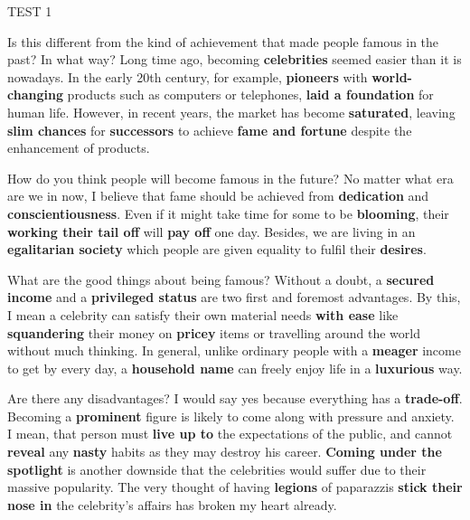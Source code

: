\begin{glossarymc}[Cambridge 5]
\begin{test}{TEST 1}
    \begin{qa}{Is this different from the kind of achievement that made people famous in the past? In what way?}
    Long time ago, becoming \textbf{celebrities} seemed easier than it is nowadays. In the early 20th century, for example, \textbf{pioneers} with \textbf{world-changing} products such as computers or telephones, \textbf{laid a foundation} for human life. However, in recent years, the market has become \textbf{saturated}, leaving \textbf{slim chances} for \textbf{successors} to achieve \textbf{fame and fortune} despite the enhancement of products.
    \end{qa}

    \begin{qa}{How do you think people will become famous in the future?}
    No matter what era are we in now, I believe that fame should be achieved from \textbf{dedication} and \textbf{conscientiousness}. Even if it might take time for some to be \textbf{blooming}, their \textbf{working their tail off} will \textbf{pay off} one day. Besides, we are living in an \textbf{egalitarian society} which people are given equality to fulfil their \textbf{desires}.
    \end{qa}

    \begin{qa}{What are the good things about being famous?}
    Without a doubt, a \textbf{secured income} and a \textbf{privileged status} are two first and foremost advantages. By this, I mean a celebrity can satisfy their own material needs \textbf{with ease} like \textbf{squandering} their money on \textbf{pricey} items or travelling around the world without much thinking. In general, unlike ordinary people with a \textbf{meager} income to get by every day, a \textbf{household name} can freely enjoy life in a \textbf{luxurious} way.
    \end{qa}

    \begin{qa}{Are there any disadvantages?}
    I would say yes because everything has a \textbf{trade-off}. Becoming a \textbf{prominent} figure is likely to come along with pressure and anxiety. I mean, that person must \textbf{live up to} the expectations of the public, and cannot \textbf{reveal} any \textbf{nasty} habits as they may destroy his career. \textbf{Coming under the spotlight} is another downside that the celebrities would suffer due to their massive popularity. The very thought of having \textbf{legions} of paparazzis \textbf{stick their nose in} the celebrity’s affairs has broken my heart already.
    \end{qa}


\end{test}
\end{glossarymc}
